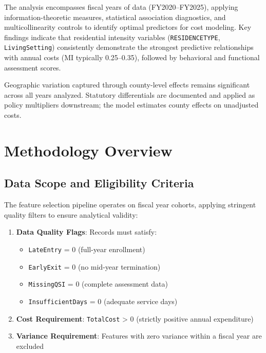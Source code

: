 The analysis encompasses \FSNumFiscalYears{} fiscal years of data (FY2020--FY2025), applying information-theoretic measures, statistical association diagnostics, and multicollinearity controls to identify optimal predictors for cost modeling. Key findings indicate that residential intensity variables (\texttt{RESIDENCETYPE}, \texttt{LivingSetting}) consistently demonstrate the strongest predictive relationships with annual costs (MI typically 0.25--0.35), followed by behavioral and functional assessment scores.

Geographic variation captured through county-level effects remains significant across all years analyzed. Statutory differentials are documented and applied as policy multipliers downstream; the model estimates county effects on unadjusted costs.

\section{Methodology Overview}

\subsection{Data Scope and Eligibility Criteria}

The feature selection pipeline operates on fiscal year cohorts, applying stringent quality filters to ensure analytical validity:

\begin{enumerate}
    \item \textbf{Data Quality Flags}: Records must satisfy:
    \begin{itemize}
        \item \texttt{LateEntry} = 0 (full-year enrollment)
        \item \texttt{EarlyExit} = 0 (no mid-year termination)
        \item \texttt{MissingQSI} = 0 (complete assessment data)
        \item \texttt{InsufficientDays} = 0 (adequate service days)
    \end{itemize}
    
    \item \textbf{Cost Requirement}: \texttt{TotalCost} > 0 (strictly positive annual expenditure)
    
    \item \textbf{Variance Requirement}: Features with zero variance within a fiscal year are excluded
\end{enumerate}

